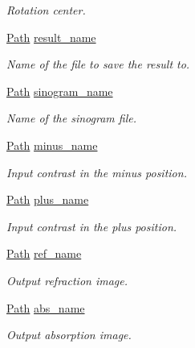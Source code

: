 \begin{DoxyCompactItemize}
\begin{DoxyCompactList}\small\item\em Rotation center. \item\end{DoxyCompactList}\item 
\hyperlink{classPath}{Path} \hyperlink{structclargs_ab616d9618e9a08b78d6205db44b72c1e}{result\_\-name}
\begin{DoxyCompactList}\small\item\em Name of the file to save the result to. \item\end{DoxyCompactList}\item 
\hyperlink{classPath}{Path} \hyperlink{structclargs_a5161f24147130f9f95c6fcdfce8d15a1}{sinogram\_\-name}
\begin{DoxyCompactList}\small\item\em Name of the sinogram file. \item\end{DoxyCompactList}\item 
\hyperlink{classPath}{Path} \hyperlink{structclargs_af4d7f13b75bcc0643896d80c7da1e953}{minus\_\-name}
\begin{DoxyCompactList}\small\item\em Input contrast in the minus position. \item\end{DoxyCompactList}\item 
\hyperlink{classPath}{Path} \hyperlink{structclargs_acb00f5d12f5dd85809edebb2071693b7}{plus\_\-name}
\begin{DoxyCompactList}\small\item\em Input contrast in the plus position. \item\end{DoxyCompactList}\item 
\hyperlink{classPath}{Path} \hyperlink{structclargs_a9f69d5325017a6fbbf567588bee36653}{ref\_\-name}
\begin{DoxyCompactList}\small\item\em Output refraction image. \item\end{DoxyCompactList}\item 
\hyperlink{classPath}{Path} \hyperlink{structclargs_acf708361110dcb43acb7c9cccdfd7f74}{abs\_\-name}
\begin{DoxyCompactList}\small\item\em Output absorption image. \item\end{DoxyCompactList}\item 

\end{DoxyCompactItemize}
